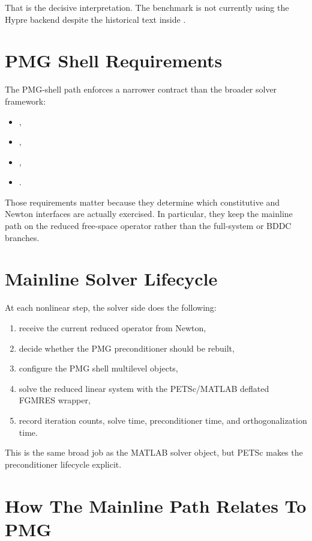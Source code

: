 That is the decisive interpretation. The benchmark is not currently using the
Hypre backend despite the historical text inside .

\section{PMG Shell Requirements}

The PMG-shell path enforces a narrower contract than the broader solver
framework:
\begin{itemize}
\item {},
\item {},
\item {},
\item {}.
\end{itemize}

Those requirements matter because they determine which constitutive and Newton
interfaces are actually exercised. In particular, they keep the mainline path on
the reduced free-space operator rather than the full-system or BDDC branches.

\section{Mainline Solver Lifecycle}

At each nonlinear step, the solver side does the following:
\begin{enumerate}
\item receive the current reduced operator from Newton,
\item decide whether the PMG preconditioner should be rebuilt,
\item configure the PMG shell multilevel objects,
\item solve the reduced linear system with the PETSc/MATLAB deflated FGMRES
wrapper,
\item record iteration counts, solve time, preconditioner time, and
orthogonalization time.
\end{enumerate}

This is the same broad job as the MATLAB solver object, but PETSc makes the
preconditioner lifecycle explicit.

\section{How The Mainline Path Relates To PMG}


